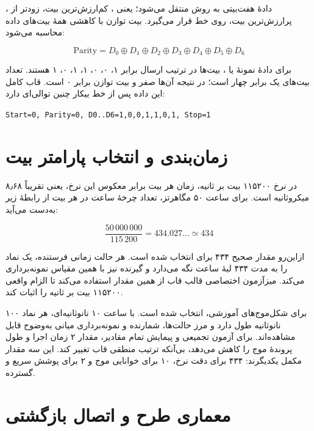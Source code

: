 دادهٔ هفت‌بیتی به روش  منتقل می‌شود؛ یعنی ، کم‌ارزش‌ترین
بیت، زودتر از ، پرارزش‌ترین
بیت، روی خط قرار می‌گیرد. بیت توازن با 
کاهشی همهٔ بیت‌های داده محاسبه می‌شود:

\begin{equation}
\mathrm{Parity}=D_0 \oplus D_1 \oplus D_2 \oplus D_3 \oplus D_4 \oplus D_5 \oplus D_6
\end{equation}

برای دادهٔ نمونهٔ  یا ، بیت‌ها در ترتیب ارسال برابر ۱، ۰، ۰،
۱، ۱، ۰، ۱ هستند. تعداد بیت‌های یک برابر چهار است؛ در نتیجه  آن‌ها صفر و بیت
توازن برابر ۰ است. قاب کامل این داده پس از خط بیکار چنین توالی‌ای دارد:

\begin{latin}
\begin{center}
\texttt{Start=0, Parity=0, D0..D6=1,0,0,1,1,0,1, Stop=1}
\end{center}
\end{latin}


\section{زمان‌بندی و انتخاب پارامتر بیت}

در نرخ ۱۱۵۲۰۰ بیت بر ثانیه، زمان هر بیت برابر معکوس این نرخ، یعنی تقریباً ۸٫۶۸
میکروثانیه است. برای ساعت ۵۰ مگاهرتز، تعداد چرخهٔ ساعت در هر بیت از رابطهٔ زیر به‌دست
می‌آید:

\begin{equation}
\frac{50\,000\,000}{115\,200}=434.027\ldots \simeq 434
\end{equation}

ازاین‌رو مقدار صحیح ۴۳۴ برای  انتخاب شده است. هر حالت زمانی فرستنده، یک
نماد را به مدت ۴۳۴ لبهٔ ساعت نگه می‌دارد و گیرنده نیز با همین مقیاس نمونه‌برداری می‌کند.
میزآزمون اختصاصی قالب قاب از همین مقدار استفاده می‌کند تا الزام واقعی ۱۱۵۲۰۰ بیت بر
ثانیه را اثبات کند.

برای شکل‌موج‌های آموزشی،  انتخاب شده است. با ساعت ۱۰ نانوثانیه‌ای،
هر نماد ۱۰۰ نانوثانیه طول دارد و مرز حالت‌ها، شمارنده و نمونه‌برداری میانی به‌وضوح قابل
مشاهده‌اند. برای آزمون تجمیعی و پیمایش تمام مقادیر، مقدار ۲ زمان اجرا و طول پروندهٔ موج
را کاهش می‌دهد، بی‌آنکه ترتیب منطقی قاب تغییر کند. این سه مقدار مکمل یکدیگرند: ۴۳۴ برای
دقت نرخ، ۱۰ برای خوانایی موج و ۲ برای پوشش سریع و گسترده.


\section{معماری طرح و اتصال بازگشتی}

